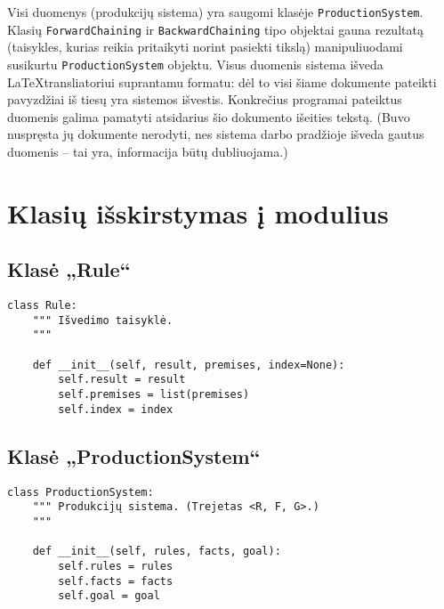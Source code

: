 \begin{sloppypar}
Visi duomenys (produkcijų sistema) yra saugomi klasėje
\verb|ProductionSystem|. Klasių \verb|ForwardChaining| ir
\verb|BackwardChaining| tipo objektai gauna rezultatą (taisykles,
kurias reikia pritaikyti norint pasiekti tikslą) manipuliuodami
susikurtu \verb|ProductionSystem| objektu. Visus duomenis sistema
išveda \LaTeX transliatoriui suprantamu formatu: dėl to visi šiame
dokumente pateikti pavyzdžiai iš tiesų yra sistemos išvestis.
Konkrečius programai pateiktus duomenis galima pamatyti atsidarius šio
dokumento išeities tekstą. (Buvo nuspręsta jų dokumente nerodyti,
nes sistema darbo pradžioje išveda gautus duomenis – tai yra,
informacija būtų dubliuojama.)
\end{sloppypar}

\section{Klasių išskirstymas į modulius}


\subsection{Klasė „Rule“}

\begin{verbatim}
class Rule:
    """ Išvedimo taisyklė.
    """

    def __init__(self, result, premises, index=None):
        self.result = result
        self.premises = list(premises)
        self.index = index
\end{verbatim}

\subsection{Klasė „ProductionSystem“}

\begin{verbatim}
class ProductionSystem:
    """ Produkcijų sistema. (Trejetas <R, F, G>.)
    """

    def __init__(self, rules, facts, goal):
        self.rules = rules
        self.facts = facts
        self.goal = goal
\end{verbatim}
